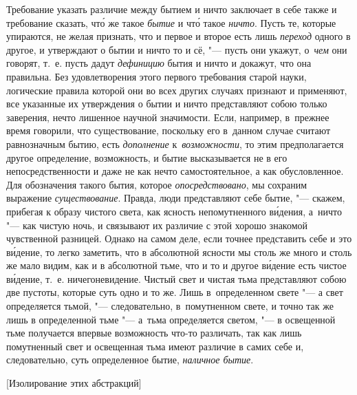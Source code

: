 Требование указать различие между бытием и ничто заключает в себе также и
требование сказать, чт\'{о} же такое {\em бытие} и чт\'{о} такое {\em ничто}.
Пусть те, которые упираются, не желая признать, что и первое и второе есть лишь
{\em переход} одного в другое, и утверждают о бытии и ничто то и сё, "--- пусть
они укажут, о~{\em чем} они говорят, т.~е. пусть дадут {\em дефиницию} бытия и
ничто и докажут, что она правильна. Без удовлетворения этого первого требования
старой науки, логические правила которой они во всех других случаях признают и
применяют, все указанные их утверждения о бытии и ничто представляют собою
только заверения, нечто лишенное научной значимости. Если, например, в~прежнее
время говорили, что существование, поскольку его в~данном случае считают
равнозначным бытию, есть {\em дополнение} к~{\em возможности}, то этим
предполагается другое определение, возможность, и бытие высказывается не в его
непосредственности и даже не как нечто самостоятельное, а как обусловленное.
Для обозначения такого бытия, которое {\em опосредствовано}, мы сохраним
выражение {\em существование}. Правда, люди представляют себе бытие, "---
скажем, прибегая к образу чистого света, как ясность непомутненного
в\'{и}дения, а~ничто "--- как чистую ночь, и связывают их различие с этой
хорошо знакомой чувственной разницей. Однако на самом деле, если точнее
представить себе и это в\'{и}дение, то легко заметить, что в абсолютной ясности
мы столь же много и столь же мало видим, как и в абсолютной тьме, что и то и
другое в\'{и}дение есть чистое в\'{и}дение, т.~е. ничегоневидение. Чистый свет
и чистая тьма представляют собою две пустоты, которые суть одно и то же. Лишь
в~определенном свете "--- а свет определяется тьмой, "--- следовательно,
в~помутненном свете, и точно так же лишь в определенной тьме "--- а~тьма
определяется светом, "--- в освещенной тьме получается впервые возможность
что-то различать, так как лишь помутненный свет и освещенная тьма имеют
различие в самих себе и, следовательно, суть определенное бытие,
{\em наличное бытие}.

%
{[Изолирование этих абстракций]}

